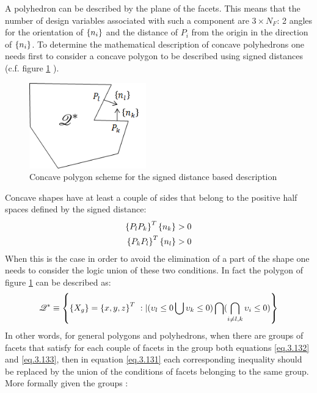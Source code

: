      A polyhedron can be described by the plane of the facets. This means that the number of design variables associated with such a component are $3\times N_F$: 2 angles for the orientation of  $\left\lbrace{n_i}\right \rbrace$ and the distance of $P_i$ from the origin in the direction of  $\left\lbrace{n_i}\right \rbrace$. 
    To determine the mathematical description of concave polyhedrons one needs first to consider a concave polygon to be described using signed distances (c.f. figure \ref{fig:3.33} ). 
\begin{figure}[!ht]
            \centering
             \includegraphics[width=0.45\textwidth]{images/Ch3/concave_polygon}
           \caption{Concave polygon scheme for the signed distance based description}
           \label{fig:3.33}       %
\end{figure}
Concave shapes have at least a couple of sides that belong to the positive half spaces defined by the signed distance:
     \begin{eqnarray} 
     \label{eq.3.132}
     \left\lbrace{P_lP_k}\right \rbrace^T\left\lbrace{n_k}\right \rbrace>0\\
     \label{eq.3.133}
     \left\lbrace{P_kP_l}\right \rbrace^T\left\lbrace{n_l}\right \rbrace>0
     \end{eqnarray}
     When this is the case in order to avoid the elimination of a part of the shape one needs to consider the logic union of these two conditions. In fact the polygon of figure  \ref{fig:3.33} can be described as: 
   \begin{equation}
           \label{eq.3.134}
           \mathscr{Q^*} \equiv\left\lbrace{\ensuremath\left\lbrace{X_g}\right \rbrace=\ensuremath\left\lbrace{x,y,z}\right \rbrace^T\ :| (\upsilon_l\leq 0\bigcup\upsilon_k\leq 0)\bigcap(\bigcap_{i\neq l,k}{\upsilon_i\leq 0})}\right \rbrace
    \end{equation}
    In other words, for general polygons and polyhedrons, when there are groups of facets that satisfy for each couple of facets in the group both equations \eqref{eq.3.132} and \eqref{eq.3.133}, then in equation \eqref{eq.3.131} each corresponding inequality should be replaced by the union of the conditions of facets belonging to the same group. More formally given the groups :
